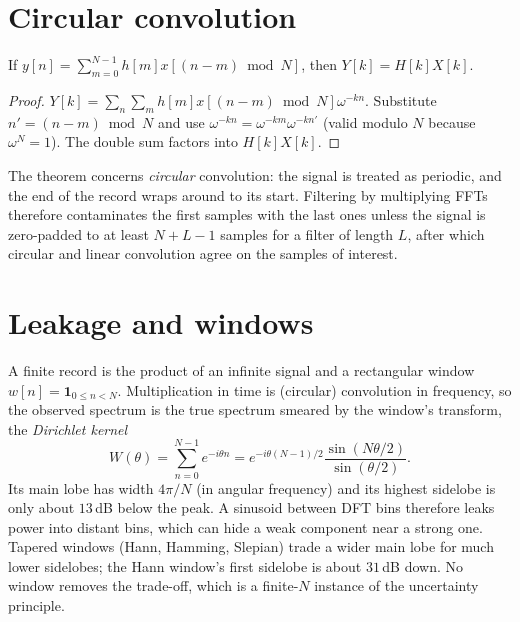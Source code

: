 \section{Circular convolution}
\begin{theorem}
If $y[n]=\sum_{m=0}^{N-1}h[m]x[(n-m)\bmod N]$, then $Y[k]=H[k]X[k]$.
\end{theorem}
\begin{proof}
$Y[k]=\sum_n\sum_mh[m]x[(n-m)\bmod N]\omega^{-kn}$. Substitute $n'=(n-m)\bmod N$ and use $\omega^{-kn}=\omega^{-km}\omega^{-kn'}$ (valid modulo $N$ because $\omega^N=1$). The double sum factors into $H[k]X[k]$.
\end{proof}
The theorem concerns \emph{circular} convolution: the signal is treated as periodic, and the end of the record wraps around to its start. Filtering by multiplying FFTs therefore contaminates the first samples with the last ones unless the signal is zero-padded to at least $N+L-1$ samples for a filter of length $L$, after which circular and linear convolution agree on the samples of interest.

\section{Leakage and windows}
A finite record is the product of an infinite signal and a rectangular window $w[n]=\mathbf 1_{0\le n<N}$. Multiplication in time is (circular) convolution in frequency, so the observed spectrum is the true spectrum smeared by the window's transform, the \emph{Dirichlet kernel}
\[
W(\theta)=\sum_{n=0}^{N-1}e^{-i\theta n}=e^{-i\theta(N-1)/2}\frac{\sin(N\theta/2)}{\sin(\theta/2)}.
\]
Its main lobe has width $4\pi/N$ (in angular frequency) and its highest sidelobe is only about $13$\,dB below the peak. A sinusoid between DFT bins therefore leaks power into distant bins, which can hide a weak component near a strong one. Tapered windows (Hann, Hamming, Slepian) trade a wider main lobe for much lower sidelobes; the Hann window's first sidelobe is about $31$\,dB down. No window removes the trade-off, which is a finite-$N$ instance of the uncertainty principle.

